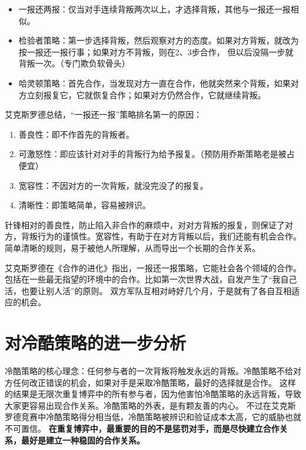 \documentclass[12pt, a4paper]{article}
\begin{document}
\begin{CJK*}{UTF8}{gbsn}
        \begin{itemize}
            \item 一报还两报：仅当对手连续背叛两次以上，才选择背叛，其他与一报还一报相似。
            \item 检验者策略：第一步选择背叛，然后观察对方的态度。如果对方背叛，就改为按一报还一报行事；如果对方不背叛，则在2、3步合作，
            但以后没隔一步就背叛一次。（专门欺负软骨头）
            \item 哈灵顿策略：首先合作，当发现对方一直在合作，他就突然来个背叛，如果对方立刻报复它，它就恢复合作；如果对方仍然合作，它就继续背叛。
        \end{itemize}

        艾克斯罗德总结，“一报还一报”策略排名第一的原因：
        \begin{enumerate}
            \item 善良性：即不作首先的背叛者。
            \item 可激怒性：即应该针对对手的背叛行为给予报复。（预防用乔斯策略老是被占便宜）
            \item 宽容性：不因对方的一次背叛，就没完没了的报复。
            \item 清晰性：即策略简单，容易被辨识。
        \end{enumerate}
        针锋相对的善良性，防止陷入非合作的麻烦中，对对方背叛的报复，则保证了对方，背叛行为的谨慎性。宽容性，有助于在对方背叛以后，我们还能有机会合作。
        简单清晰的规则，易于被他人所理解，从而导出一个长期的合作关系。\par
        艾克斯罗德在《合作的进化》指出，一报还一报策略，它能社会各个领域的合作。包括在一些最无指望的环境中的合作。比如第一次世界大战，自发产生了“我自己活，也要让别人活”的原则。
        双方军队互相对峙好几个月，于是就有了各自互相适应的机会。

        \section{对冷酷策略的进一步分析}
        冷酷策略的核心理念：任何参与者的一次背叛将触发永远的背叛。冷酷策略不给对方任何改正错误的机会，如果对手是采取冷酷策略，最好的选择就是合作。
        这样的结果是无限次重复博弈中的所有参与者，因为他害怕冷酷策略的永远背叛，导致大家更容易出现合作关系。冷酷策略的外表，是有颗友善的内心。
        不过在艾克斯罗德竞赛中冷酷策略得分相当低，冷酷策略被辨识和验证成本太高，它的威胁也就不可置信。
        \textbf{在重复博弈中，最重要的目的不是惩罚对手，而是尽快建立合作关系，最好是建立一种稳固的合作关系。} \par


\end{CJK*}
\end{document}
